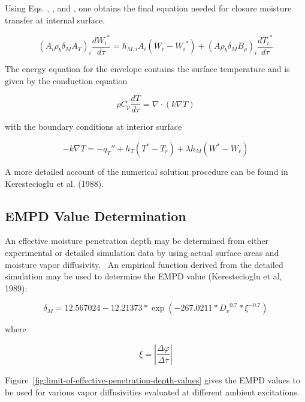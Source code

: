 Using Eqs. , , and , one obtains the final equation needed for closure moisture transfer at internal surface.

\begin{equation}
{({A_i}{\rho_b}{\delta_M}{A_T})_i}\frac{{d{W_i}^*}}{{d\tau }} = {h_{M,i}}{A_i}({W_r} - {W_i}^*) + {(A{\rho_b}{\delta_M}{B_\rho })_i}\frac{{d{T_i}^*}}{{d\tau }}
\end{equation}

The energy equation for the envelope contains the surface temperature and is given by the conduction equation

\begin{equation}
\rho {C_p}\frac{{dT}}{{d\tau }} = \nabla  \cdot (k\nabla T)
\end{equation}

with the boundary conditions at interior surface

\begin{equation}
- k\nabla T =  - {q_T}'' + {h_T}({T^*} - {T_r}) + \lambda {h_M}({W^*} - {W_r})
\end{equation}

A more detailed account of the numerical solution procedure can be found in Kerestecioglu et al. (1988).

\subsection{EMPD Value Determination}\label{empd-value-determination}

An effective moisture penetration depth may be determined from either experimental or detailed simulation data by using actual surface areas and moisture vapor diffusivity.~ An empirical function derived from the detailed simulation may be used to determine the EMPD value (Kerestecioglu et al, 1989):

\begin{equation}
{\delta_M} = 12.567024 - 12.21373*\exp \left( { - 267.0211*{D_v}^{0.7}*{\xi ^{ - 0.7}}} \right)
\end{equation}

where

\begin{equation}
\xi  = \left| {\frac{{\Delta \varphi }}{{\Delta \tau }}} \right|
\end{equation}

Figure~\ref{fig:limit-of-effective-penetration-depth-values} gives the EMPD values to be used for various vapor diffusivities evaluated at different ambient excitations.

